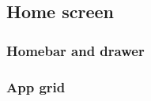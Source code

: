 \subsection{Home screen}
\label{backlog:home_screen}

\subsubsection{Homebar and drawer}
\label{backlog:homebar_drawer}

\subsubsection{App grid}
\label{backlog:appgrid}